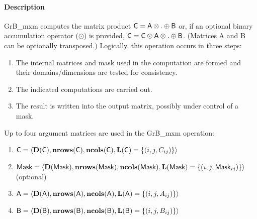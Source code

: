 \paragraph{Description}

{\sf GrB\_mxm} computes the matrix product ${\bf \sf C} = {\bf \sf
A} \otimes . \oplus {\bf \sf B}$ or, if an optional binary accumulation
operator ($\odot$) is provided, ${\bf \sf C} = {\bf \sf C} \odot
{\bf \sf A} \otimes . \oplus {\bf \sf B}$.  (Matrices {\sf A}
and {\sf B} can be optionally transposed.)  Logically, this operation
occurs in three steps:
\begin{enumerate}
\item The internal matrices and mask used in the computation are formed and their domains/dimensions are tested for consistency.
\item The indicated computations are carried out.
\item The result is written into the output matrix, possibly under control of a mask.
\end{enumerate}

Up to four argument matrices are used in the {\sf GrB\_mxm} operation:
\begin{enumerate}
\item ${\bf \sf C} = \langle \bold{D}({\sf C}),\bold{nrows}({\bf \sf C}),\bold{ncols}({\bf \sf C}),\bold{L}({\bf \sf C}) = \{(i,j,C_{ij}) \} \rangle$
\item ${\bf \sf Mask} = \langle \bold{D}({\sf Mask}),\bold{nrows}({\bf \sf Mask}),\bold{ncols}({\bf \sf Mask}),\bold{L}({\bf \sf Mask}) = \{(i,j,{\sf Mask}_{ij}) \} \rangle$ (optional)
\item ${\bf \sf A} = \langle \bold{D}({\sf A}),\bold{nrows}({\bf \sf A}), \bold{ncols}({\bf \sf A}),\bold{L}({\bf \sf A}) = \{(i,j,A_{ij}) \} \rangle$
\item ${\bf \sf B} = \langle \bold{D}({\sf B}),\bold{nrows}({\bf \sf B}), \bold{ncols}({\bf \sf B}),\bold{L}({\bf \sf B}) = \{(i,j,B_{ij}) \} \rangle$
\end{enumerate}


